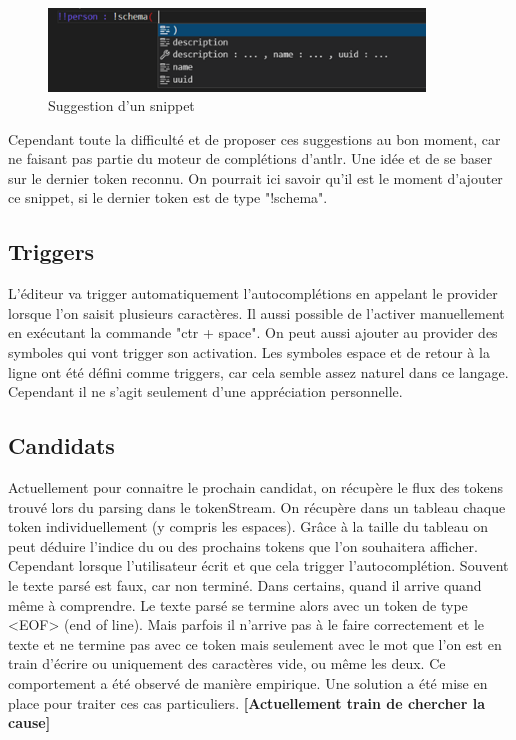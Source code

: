\documentclass[
    iict, %
    il, %
]{heig-tb}
\begin{document}
\begin{figure}[!ht]
    \begin{center}
        \includegraphics[width=10cm]{assets/figures/snippet-suggestion.png}
    \end{center}
    \caption[Suggestion d'un snippet]{\label{snippet-suggestion} Suggestion d'un snippet}
\end{figure}

Cependant toute la difficulté et de proposer ces suggestions au bon moment, car ne faisant pas partie du moteur de complétions d’antlr. Une idée et de se baser sur le dernier token reconnu. On pourrait ici savoir qu’il est le moment d’ajouter ce snippet, si le dernier token est de type "!schema".

\subsection{Triggers}
L’éditeur va trigger automatiquement l’autocomplétions en appelant le provider lorsque l’on saisit plusieurs caractères. Il aussi possible de l’activer manuellement en exécutant la commande "ctr + space".
On peut aussi ajouter au provider des symboles qui vont trigger son activation. Les symboles espace et de retour à la ligne ont été défini comme triggers, car cela semble assez naturel dans ce langage. Cependant il ne s’agit seulement d’une appréciation personnelle.

\subsection{Candidats}
Actuellement pour connaitre le prochain candidat, on récupère le flux des tokens trouvé lors du parsing dans le tokenStream. On récupère dans un tableau chaque token individuellement (y compris les espaces).  Grâce à la taille du tableau on peut déduire l’indice du ou des prochains tokens que l’on souhaitera afficher.
Cependant lorsque l’utilisateur écrit et que cela trigger l’autocomplétion. Souvent le texte parsé est faux, car non terminé. Dans certains, quand il arrive quand même à comprendre. Le texte parsé se termine alors avec un token de type <EOF> (end of line).
Mais parfois il n’arrive pas à le faire correctement et le texte et ne termine pas avec ce token mais seulement avec le mot que l’on est en train d’écrire ou uniquement des caractères vide, ou même les deux.
Ce comportement a été observé de manière empirique. Une solution a été mise en place pour traiter ces cas particuliers.
\textbf{[Actuellement train de chercher la cause]}
\end{document}
